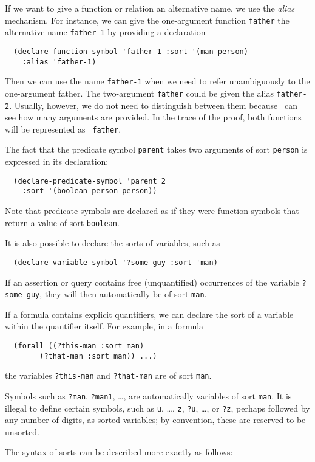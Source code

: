 If we want to give a function or relation an alternative name, we use the
{\em alias} mechanism.  For instance, we can give the one-argument function
{\tt father} the alternative name {\tt father-1} by providing a declaration
\begin{verbatim}
  (declare-function-symbol 'father 1 :sort '(man person)
    :alias 'father-1)
\end{verbatim}
Then we can use the name {\tt father-1} when we need to refer unambiguously
to the one-argument father.  The two-argument {\tt father} could be given the
alias {\tt father-2}.  Usually, however, we do not need to distinguish
between them because \snark\  can see how many arguments are provided.
In the trace of the proof, both functions will be represented as {\tt
father}.

The fact that the predicate symbol {\tt parent} takes two arguments of
sort {\tt person} is expressed in its declaration:
\begin{verbatim}
  (declare-predicate-symbol 'parent 2
    :sort '(boolean person person))
\end{verbatim}
Note that predicate symbols are declared as if they were function
symbols that return a value of sort {\tt boolean}.




It is also possible to declare the sorts of variables, such as
\begin{verbatim}
  (declare-variable-symbol '?some-guy :sort 'man)
\end{verbatim}
If an assertion or query contains free (unquantified) occurrences of the
variable \verb'?some-guy', they will then automatically be of sort
\verb'man'.

If a formula contains explicit quantifiers, we can declare the sort of a
variable within the quantifier itself.  For example, in a formula
\begin{verbatim}
  (forall ((?this-man :sort man)
        (?that-man :sort man)) ...)
\end{verbatim}
the variables \verb'?this-man' and \verb'?that-man' are of sort \verb'man'.

Symbols such as {\tt ?man}, {\tt ?man1}, \ldots\/, are automatically
variables of sort {\tt man}.  It is illegal to define certain symbols,
such as {\tt u}, \ldots\/, {\tt z}, {\tt ?u}, \ldots\/, or {\tt ?z},
perhaps followed by any number of digits, as sorted variables; by
convention, these are reserved to be unsorted.

The syntax of sorts can be described more exactly as follows:

